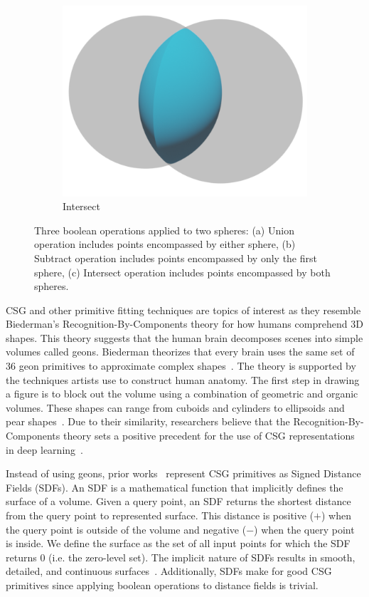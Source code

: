 \begin{figure}
\begin{subfigure}[t]{0.3\textwidth}
		\includegraphics[width=\textwidth]{Images/Intersect}
		\caption{Intersect}
	\end{subfigure}
	\caption{Three boolean operations applied to two spheres: (a) Union operation includes points encompassed by either sphere, (b) Subtract operation includes points encompassed by only the first sphere, (c) Intersect operation includes points encompassed by both spheres.}
	\label{fig:boolean operations}
\end{figure}

CSG and other primitive fitting techniques are topics of interest as they resemble Biederman's Recognition-By-Components theory for how humans comprehend 3D shapes. This theory suggests that the human brain decomposes scenes into simple volumes called geons. Biederman theorizes that every brain uses the same set of 36 geon primitives to approximate complex shapes~\cite{Biederman1987}. The theory is supported by the techniques artists use to construct human anatomy. The first step in drawing a figure is to block out the volume using a combination of geometric and organic volumes. These shapes can range from cuboids and cylinders to ellipsoids and pear shapes~\cite{Winslow2015}. Due to their similarity, researchers believe that the Recognition-By-Components theory sets a positive precedent for the use of CSG representations in deep learning~\cite{Sharma2018}.

\newpage

Instead of using geons, prior works~\cite{Sharma2018, Kania2020, Ren2021} represent CSG primitives as Signed Distance Fields (SDFs). An SDF is a mathematical function that implicitly defines the surface of a volume. Given a query point, an SDF returns the shortest distance from the query point to represented surface. This distance is positive ($+$) when the query point is outside of the volume and negative ($-$) when the query point is inside. We define the surface as the set of all input points for which the SDF returns 0 (i.e. the zero-level set). The implicit nature of SDFs results in smooth, detailed, and continuous surfaces~\cite{Park2019}. Additionally, SDFs make for good CSG primitives since applying boolean operations to distance fields is trivial.

